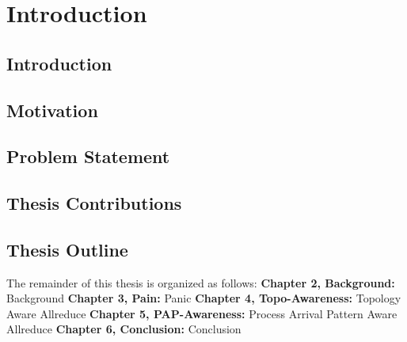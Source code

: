 
\glsresetall %
\chapter[Introduction]{Introduction}\label{ch:Introduction}

\section{Introduction}

\section{Motivation}

\section{Problem Statement}

\section{Thesis Contributions}


\section{Thesis Outline}

The remainder of this thesis is organized as follows:
\noindent\textbf{Chapter 2, Background:} Background
\noindent\textbf{Chapter 3, Pain:} Panic
\noindent\textbf{Chapter 4, Topo-Awareness:} Topology Aware Allreduce
\noindent\textbf{Chapter 5, PAP-Awareness:} Process Arrival Pattern Aware Allreduce
\noindent\textbf{Chapter 6, Conclusion:} Conclusion